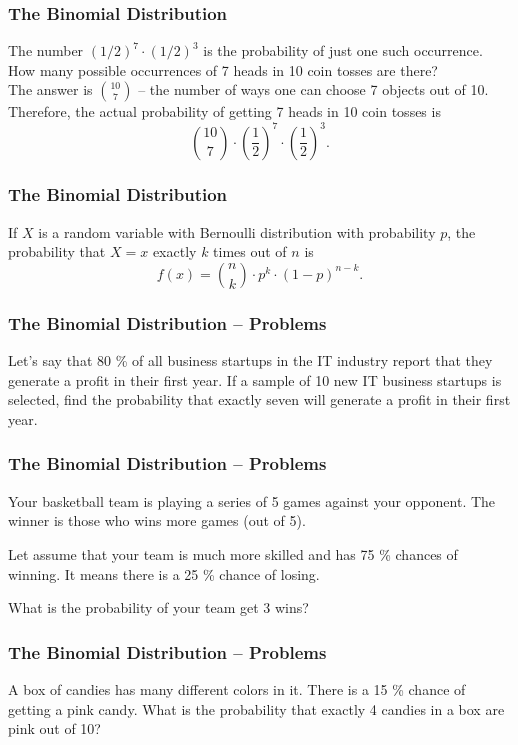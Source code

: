 \documentclass[aspectratio=169,11pt,usenames,dvipsnames,handout]{beamer}
\begin{document}
\begin{frame}
 \frametitle{The Binomial Distribution}
 The number $(1 / 2)^{7} \cdot (1 / 2)^3$ is the probability of \alert{just one
 such occurrence}.\\ \pause
 How many possible occurrences of 7 heads in 10 coin tosses are there?\\ \pause
 The answer is $\binom{10}{7}$ -- the number of ways one can choose 7 objects
 out of 10.\\ \pause
 Therefore, the \alert{actual probability} of getting 7 heads in 10 coin tosses
 is 
 \[
  \binom{10}{7} \cdot \left( \frac{1}{2} \right)^{7} \cdot \left( \frac{1}{2}
  \right)^3.
 \]
\end{frame}

\begin{frame}
 \frametitle{The Binomial Distribution}
 \begin{tcolorbox}[title=Def\hspace{0pt}inition]
  If $X$ is a random variable with \alert{Bernoulli distribution} with
  probability $p$, the probability that $X = x$ exactly $k$ times out of $n$ is
  \[
   f(x) = \binom{n}{k} \cdot p^{k} \cdot (1-p)^{n-k}.
  \]
 \end{tcolorbox}
\end{frame}

\begin{frame}
 \frametitle{The Binomial Distribution -- Problems}
 Let’s say that 80 \% of all business startups in the IT industry report that
 they generate a profit in their first year. If a sample of 10 new IT business
 startups is selected, find the probability that exactly seven will generate a
 profit in their first year.
\end{frame}

\begin{frame}
 \frametitle{The Binomial Distribution -- Problems}
 Your basketball team is playing a series of 5 games against your opponent. The winner is those who wins more games (out of 5).

 Let assume that your team is much more skilled and has 75 \% chances of winning.
 It means there is a 25 \% chance of losing.

 What is the probability of your team get 3 wins?
\end{frame}

\begin{frame}
 \frametitle{The Binomial Distribution -- Problems}
 A box of candies has many different colors in it. There is a 15 \% chance of
 getting a pink candy. What is the probability that exactly 4 candies in a box
 are pink out of 10?
\end{frame}
\end{document}
